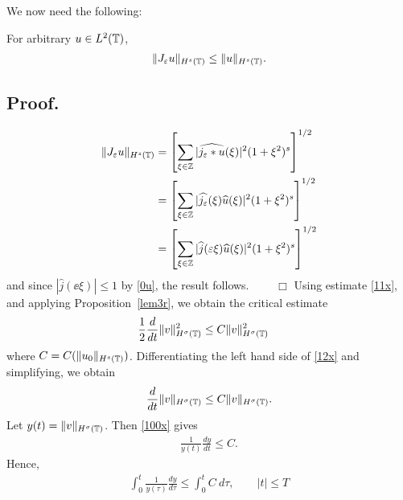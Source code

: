 We now need the following:
\begin{proposition}
\label{lem3r}
For arbitrary $u \in L^2(\mathbb{T})$,
\begin{equation}
\begin{split}
\|J_\varepsilon u\|_{H^s(\mathbb{T})} \le \|u\|_{H^s(\mathbb{T})}.
\label{lem100u}
\end{split}
\end{equation}
\end{proposition}
%
%
%
%
\subsection{Proof.}
\begin{equation*}
\begin{split}
\|J_\varepsilon u\|_{H^s(\mathbb{T})} 
& = \left[\sum_{\xi \in \mathbb{Z}} |\widehat{j_\varepsilon * u}(\xi) |^2
(1+\xi^2)^s \right ]^{1/2}
\\
& = \left [ \sum_{\xi \in \mathbb{Z}} |\widehat{j_\varepsilon} (\xi) \widehat{u}(\xi) |^2
(1+ \xi^2)^s \right ]^{1/2}
\\
& = \left [ \sum_{\xi \in \mathbb{Z}} |\widehat{j}(\varepsilon \xi)
\widehat{u}(\xi)|^2 ( 1+ \xi^2)^s \right ]^{1/2}
\end{split}
\end{equation*}
and since $|\widehat{j }(\ee \xi) | \le 1$ by \eqref{0u}, the result
follows. $\qquad \Box$
Using estimate \eqref{11x}, and applying Proposition~\ref{lem3r}, 
we obtain the critical estimate 
\begin{equation}
\begin{split}
\label{12x}
\frac{1}{2}\frac{d}{dt} \|v\|_{H^{\sigma}(\mathbb{T})}^2
& \le
C \|v\|_{H^{\sigma}(\mathbb{T})}^2
\end{split}
\end{equation}
where $C = C(\|u_0\|_{H^s(\mathbb{T})})$. Differentiating the left hand side of
\eqref{12x} and simplifying, we obtain
\begin{equation}
\begin{split}
\frac{d}{dt}\|v\|_{H^{\sigma}(\mathbb{T})} \le C \|v\|_{H^{\sigma}(\mathbb{T})}.
\label{100x}
\end{split}
\end{equation}
Let $y(t) = \|v\|_{H^{\sigma}(\mathbb{T})}$. Then \eqref{100x} gives
\begin{equation*}
\begin{split}
\frac{1}{y(t)}\frac{dy}{dt} \le C.
\end{split}
\end{equation*}
Hence,
\begin{equation*}
\begin{split}
\int_0^t \frac{1}{y(\tau)} \frac{dy}{d \tau}
\le \int_0^t C \ d \tau, \qquad |t| \le T
\end{split}
\end{equation*}
